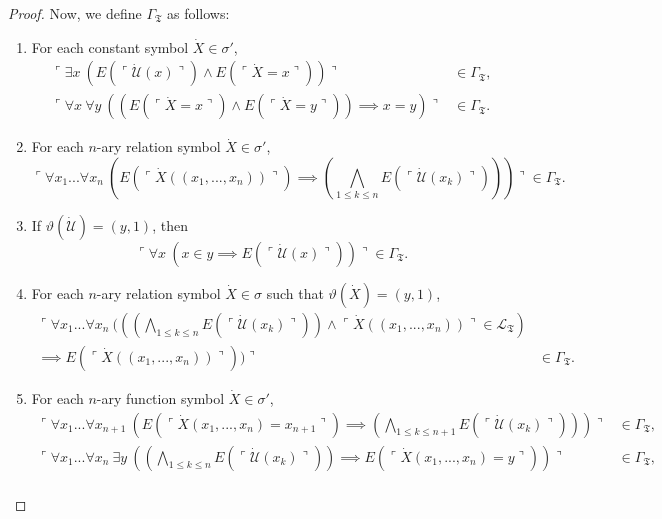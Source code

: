 \documentclass[12pt]{article}
\numberwithin{equation}{section}
\begin{document}
\begin{proof}
Now, we define $\Gamma_{\mathfrak{T}}$ as follows:
\begin{enumerate}[label=(\arabic*)]
    \item\label{gamma1} For each constant symbol $\dot{X} \in \sigma'$,
    \begin{align*}
        \ulcorner \exists x \ (E(\ulcorner \dot{\mathcal{U}}(x) \urcorner) \wedge E(\ulcorner \dot{X} = x \urcorner)) \urcorner & \in \Gamma_{\mathfrak{T}}, \\
        \ulcorner \forall x \ \forall y \ ((E(\ulcorner \dot{X} = x \urcorner) \wedge E(\ulcorner \dot{X} = y \urcorner)) \implies x = y) \urcorner & \in \Gamma_{\mathfrak{T}}.
    \end{align*}
    \item For each $n$-ary relation symbol $\dot{X} \in \sigma'$, $$\ulcorner \forall x_1 ... \forall x_n \ (E(\ulcorner \dot{X}((x_1, ..., x_n)) \urcorner) \implies (\bigwedge_{1 \leq k \leq n} E(\ulcorner \dot{\mathcal{U}}(x_k) \urcorner))) \urcorner \in \Gamma_{\mathfrak{T}}.$$
    \item\label{gammaform3} If $\vartheta(\dot{\mathcal{U}}) = (y, 1)$, then $$\ulcorner \forall x \ (x \in y \implies E(\ulcorner \dot{\mathcal{U}}(x) \urcorner)) \urcorner \in \Gamma_{\mathfrak{T}}.$$
    \item\label{gammaform4} For each $n$-ary relation symbol $\dot{X} \in \sigma$ such that $\vartheta(\dot{X}) = (y, 1)$, 
    \begin{align*}
        \ulcorner \forall x_1 ... \forall x_n \ (((\bigwedge_{1 \leq k \leq n} E(\ulcorner \dot{\mathcal{U}}(x_k) \urcorner)) \wedge \ulcorner \dot{X}((x_1, ..., x_n)) \urcorner \in \mathcal{L}_{\mathfrak{T}}) & \\
        \implies E(\ulcorner \dot{X}((x_1, ..., x_n)) \urcorner)) \urcorner & \in \Gamma_{\mathfrak{T}}.
    \end{align*}
    \item For each $n$-ary function symbol $\dot{X} \in \sigma'$, 
    \begin{align*}
        \ulcorner \forall x_1 ... \forall x_{n+1} \ (E(\ulcorner \dot{X} (x_1, ..., x_n) = x_{n+1} \urcorner) \implies (\bigwedge_{1 \leq k \leq n+1} E(\ulcorner \dot{\mathcal{U}}(x_k) \urcorner))) \urcorner & \in \Gamma_{\mathfrak{T}}, \\
        \ulcorner \forall x_1 ... \forall x_n \ \exists y \ ((\bigwedge_{1 \leq k \leq n} E(\ulcorner \dot{\mathcal{U}}(x_k) \urcorner)) \implies E(\ulcorner \dot{X}(x_1, ..., x_n) = y \urcorner)) \urcorner & \in \Gamma_{\mathfrak{T}}, \\

\end{align*}
\end{enumerate}
\end{proof}
\end{document}

